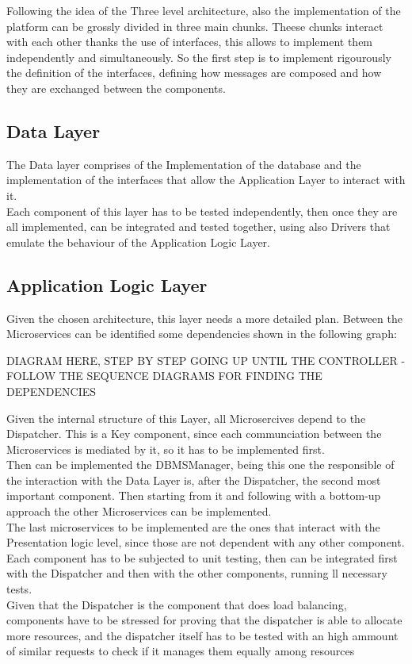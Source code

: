Following the idea of the Three level architecture, also the implementation of the platform can be grossly divided in three main chunks.
Theese chunks interact with each other thanks the use of interfaces, this allows to implement them independently and simultaneously. So the first step is to implement rigourously the definition of the interfaces, defining how messages are composed and how they are exchanged between the components.\\

\subsection{Data Layer}
The Data layer comprises of the Implementation of the database and the implementation of the interfaces that allow the Application Layer to interact with it.\\
Each component of this layer has to be tested independently, then once they are all implemented, can be integrated and tested together, using also Drivers that emulate the behaviour of the Application Logic Layer.\\
\subsection{Application Logic Layer}
Given the chosen architecture, this layer needs a more detailed plan. Between the Microservices can be identified some dependencies shown in the following graph:

DIAGRAM HERE, STEP BY STEP GOING UP UNTIL THE CONTROLLER - FOLLOW THE SEQUENCE DIAGRAMS FOR FINDING THE DEPENDENCIES

Given the internal structure of this Layer, all Microsercives depend to the Dispatcher. This is a Key component, since each communciation between the Microservices is mediated by it, so it has to be implemented first.\\
Then can be implemented the DBMSManager, being this one the responsible of the interaction with the Data Layer is, after the Dispatcher, the second most important component. Then starting from it and following with a bottom-up approach the other Microservices can be implemented.\\
The last microservices to be implemented are the ones that interact with the Presentation logic level, since those are not dependent with any other component.\\
Each component has to be subjected to unit testing, then can be integrated first with the Dispatcher and then with the other components, running ll necessary tests.\\
Given that the Dispatcher is the component that does load balancing, components have to be stressed for proving that the dispatcher is able to allocate more resources, and the dispatcher itself has to be tested with an high ammount of similar requests to check if it manages them equally among resources\\

